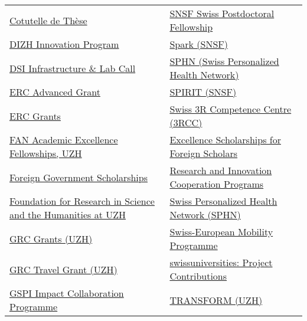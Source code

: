 \begin{table}[ht]
\begin{tabular}{ll}
\href{https://www.swissuniversities.ch/en/topics/promotion-of-young-talent/cotutelles-de-these}{Cotutelle de Thèse} & \href{https://www.research.uzh.ch/en/funding/postdoc/SNSF-Swiss-Postdoctoral-Fellowship.html}{SNSF Swiss Postdoctoral Fellowship} \\
\href{https://dizh.ch/en/activities/innovationprogram/}{DIZH Innovation Program} & \href{https://www.research.uzh.ch/en/funding/postdoc/spark.html}{Spark (SNSF)} \\
\href{https://www.dsi.uzh.ch/de/research/funding/infrastructure-lab.html}{DSI Infrastructure \& Lab Call} & \href{https://sphn.ch/}{SPHN (Swiss Personalized Health Network)} \\
\href{https://www.research.uzh.ch/en/funding/researchers/ERC-Advanced-Grant.html}{ERC Advanced Grant} & \href{https://www.research.uzh.ch/en/funding/researchers/spirit.html}{SPIRIT (SNSF)} \\
\href{https://www.research.uzh.ch/en/funding/postdoc/erc.html}{ERC Grants} & \href{https://www.research.uzh.ch/en/funding/researchers/3rcc.html}{Swiss 3R Competence Centre (3RCC) } \\
\href{https://www.fan4talents.uzh.ch/de.html}{FAN Academic Excellence Fellowships, UZH} & \href{https://www.sbfi.admin.ch/sbfi/en/home/education/scholarships-and-grants/swiss-government-excellence-scholarships.html}{ Excellence Scholarships for Foreign Scholars} \\
\href{https://www.swissuniversities.ch/en/service/scholarships-for-study-abroad/government-scholarships}{Foreign Government Scholarships} & \href{https://research.swiss/}{ Research and Innovation Cooperation Programs} \\
\href{https://www.research.uzh.ch/en/funding/researchers/stwf.html}{Foundation for Research in Science and the Humanities at UZH} & \href{https://sphn.ch/}{Swiss Personalized Health Network (SPHN)} \\
\href{https://www.grc.uzh.ch/en/funding/grc-new-grants.html}{GRC Grants (UZH)} & \href{https://www.int.uzh.ch/en/out/program/erasmus.html}{Swiss-European Mobility Programme} \\
\href{https://www.grc.uzh.ch/de/funding/grc-new-grants.html}{GRC Travel Grant (UZH)} & \href{https://www.swissuniversities.ch/en/organisation/projects-and-programmes/}{swissuniversities: Project Contributions} \\
\href{https://gspi.ch/icp/}{GSPI Impact Collaboration Programme} & \href{https://www.research.uzh.ch/en/funding/researchers/transform.html}{TRANSFORM (UZH)} \\

\end{tabular}
\end{table}
